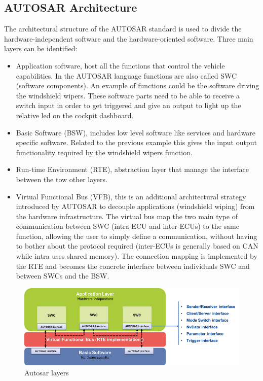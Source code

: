 \documentclass[../main.tex]{subfiles}
\begin{document}
\subsection{AUTOSAR Architecture}
The architectural structure of the \gls{AUTOSAR} standard is used to divide the hardware-independent software and the hardware-oriented software. Three main layers can be identified:
\begin{itemize}
    \item Application software, host all the functions that control the vehicle capabilities. In the \gls{AUTOSAR} language functions are also called \gls{SWC} (software components). An example of functions could be the software driving the windshield wipers. These software parts need to be able to receive a switch input in order to get triggered and give an output to light up the relative led on the cockpit dashboard.
    \item Basic Software (\gls{BSW}), includes low level software like services and hardware specific software. Related to the previous example this gives the input output functionality required by the windshield wipers function. 
    \item Run-time Environment (\gls{RTE}), abstraction layer that manage the interface between the tow other layers. 
    \item Virtual Functional Bus (\gls{VFB}), this is an additional architectural strategy introduced by \gls{AUTOSAR} to decouple applications (windshield wiping) from the hardware infrastructure. The virtual bus map the two main type of communication between \gls{SWC} (intra-\gls{ECU} and inter-\gls{ECU}s) to the same function, allowing the user to simply define a communication, without having to bother about the protocol required (inter-\gls{ECU}s is generally based on \gls{CAN} while intra uses shared memory). The connection mapping is implemented by the RTE and becomes the concrete interface between individuals \gls{SWC} and between \gls{SWC}s and the \gls{BSW}.
\end{itemize}
\begin{figure}[h]
    \centering
    \includegraphics[width=\linewidth]{images_folder/878x-autosar_layers.b68.png}
    \caption{Autosar layers}
    \label{fig:AUTLAY}
\end{figure}
\end{document}
